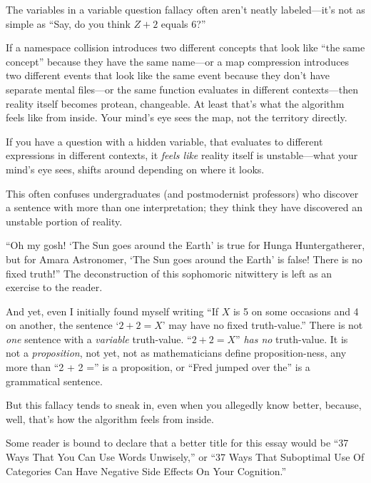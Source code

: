 {{{
 The variables in a variable question fallacy often
aren't neatly labeled---it's not as
simple as ``Say, do you think $Z + 2$ equals
6?''}

{
 If a namespace collision introduces two different concepts that
look like ``the same concept''
because they have the same name---or a map compression introduces two
different events that look like the same event because they
don't have separate mental files---or the same function
evaluates in different contexts---then reality itself becomes protean,
changeable. At least that's what the algorithm feels
like from inside. Your mind's eye sees the map, not the
territory directly.}

{
 If you have a question with a hidden variable, that evaluates to
different expressions in different contexts, it \textit{feels like}
reality itself is unstable---what your mind's eye sees,
shifts around depending on where it looks.}

{
 This often confuses undergraduates (and postmodernist professors)
who discover a sentence with more than one interpretation; they think
they have discovered an unstable portion of reality.}

{
 ``Oh my gosh! `The Sun goes around
the Earth' is true for Hunga Huntergatherer, but for
Amara Astronomer, `The Sun goes around the
Earth' is false! There is no fixed
truth!'' The deconstruction of this sophomoric
nitwittery is left as an exercise to the reader.}

{
 And yet, even I initially found myself writing
``If $X$ is 5 on some occasions and 4 on another, the
sentence `$2 + 2 = X$' may have no fixed
truth-value.'' There is not \textit{one} sentence
with a \textit{variable} truth-value. ``$2 + 2 =
X$'' \textit{has no} truth-value. It is not a
\textit{proposition}, not yet, not as mathematicians define
proposition-ness, any more than ``2 + 2
='' is a proposition, or ``Fred
jumped over the'' is a grammatical sentence.}

{
 But this fallacy tends to sneak in, even when you allegedly know
better, because, well, that's how the algorithm feels
from inside.}

\myendsectiontext


{
 Some reader is bound to declare that a better title for this essay
would be ``37 Ways That You Can Use Words
Unwisely,'' or ``37 Ways That
Suboptimal Use Of Categories Can Have Negative Side Effects On Your
Cognition.'' }

}}
